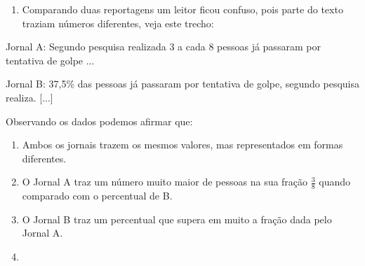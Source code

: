\begin{escolha}
\begin{boxmedio}
\begin{boxmedio}
{\begin{boxpeq}
\begin{boxpeq}
{\begin{boxpeq}
\begin{boxmedio}
\begin{boxmedio}
\begin{boxpeq}
\begin{boxmedio}
\begin{boxpeq}
\begin{boxpeq}
\begin{boxpeq}
\begin{boxpeq}
\begin{boxmedio}
{\begin{boxmedio}
\begin{boxmedio}
\begin{boxpeq}
\begin{boxmedio}
\begin{boxpeq}
\begin{boxpeq}
\begin{boxpeq}
\begin{escolha}
{\begin{boxmedio}
\begin{boxpeq}
\begin{boxpeq}
\begin{boxpeq}
\begin{boxpeq}
\begin{boxpeq}
\begin{boxmedio}
\begin{boxpeq}
\begin{boxpeq}
\begin{boxpeq}
{\begin{boxpeq}
\begin{boxmedio}
\begin{boxpeq}
\begin{boxpeq}
\begin{boxpeq}
{\begin{boxpeq}
\begin{boxmedio}
{\begin{boxpeq}
\begin{boxpeq}
\begin{boxmedio}
\begin{boxmedio}
\begin{boxpeq}
\begin{boxpeq}
{\begin{boxpeq}
\begin{boxpeq}
\begin{boxpeq}
\begin{boxpeq}
\begin{boxpeq}
\begin{escolha}
\begin{escolha}
{\begin{boxmedio}
\begin{boxpeq}
\begin{q°}
\begin{boxmedio}
\begin{boxpeq}
\begin{boxpeq}
\begin{boxmedio}
\begin{boxmedio}
\begin{boxmedio}
\begin{boxmedio}
{\begin{escolha}
\begin{escolha}
\begin{escolha}
\begin{escolha}
\begin{escolha}
\begin{escolha}
{\begin{enumerate}
\num{\arabic{enumi}.}
\setcounter{enumi}{2}
\tightlist
\item
  Comparando duas reportagens um leitor ficou confuso, pois parte do
  texto traziam números diferentes, veja este trecho:
\end{enumerate}

Jornal A: Segundo pesquisa realizada 3 a cada 8 pessoas já passaram por
tentativa de golpe ...

Jornal B: 37,5\% das pessoas já passaram por tentativa de golpe, segundo
pesquisa realiza. {[}...{]}

Observando os dados podemos afirmar que:

\begin{enumerate}

\item
  Ambos os jornais trazem os mesmos valores, mas representados em formas
  diferentes.
\item
  O Jornal A traz um número muito maior de pessoas na sua fração
  $\frac{3}{8}$ quando comparado com o percentual de B.
\item
  O Jornal B traz um percentual que supera em muito a fração dada pelo
  Jornal A.
\item

\end{enumerate}}
\end{escolha}
\end{escolha}
\end{escolha}
\end{escolha}
\end{escolha}
\end{escolha}}
\end{boxmedio}
\end{boxmedio}
\end{boxmedio}
\end{boxmedio}
\end{boxpeq}
\end{boxpeq}
\end{boxmedio}
\end{q°}
\end{boxpeq}
\end{boxmedio}}
\end{escolha}
\end{escolha}
\end{boxpeq}
\end{boxpeq}
\end{boxpeq}
\end{boxpeq}
\end{boxpeq}}
\end{boxpeq}
\end{boxpeq}
\end{boxmedio}
\end{boxmedio}
\end{boxpeq}
\end{boxpeq}}
\end{boxmedio}
\end{boxpeq}}
\end{boxpeq}
\end{boxpeq}
\end{boxpeq}
\end{boxmedio}
\end{boxpeq}}
\end{boxpeq}
\end{boxpeq}
\end{boxpeq}
\end{boxmedio}
\end{boxpeq}
\end{boxpeq}
\end{boxpeq}
\end{boxpeq}
\end{boxpeq}
\end{boxmedio}}
\end{escolha}
\end{boxpeq}
\end{boxpeq}
\end{boxpeq}
\end{boxmedio}
\end{boxpeq}
\end{boxmedio}
\end{boxmedio}}
\end{boxmedio}
\end{boxpeq}
\end{boxpeq}
\end{boxpeq}
\end{boxpeq}
\end{boxmedio}
\end{boxpeq}
\end{boxmedio}
\end{boxmedio}
\end{boxpeq}}
\end{boxpeq}
\end{boxpeq}}
\end{boxmedio}
\end{boxmedio}
\end{escolha}
